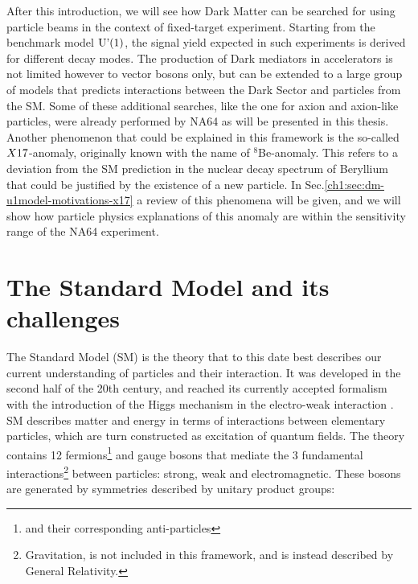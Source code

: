 After this introduction, we will see how Dark Matter can be searched for using particle beams in the context of fixed-target experiment. Starting from the benchmark model $\textrm{U'(1)}$, the signal yield expected in such experiments is derived for different decay modes. The production of Dark mediators in accelerators is not limited however to vector bosons only, but can be extended to a large group of models that predicts interactions between the Dark Sector and particles from the SM. Some of these additional searches, like the one for axion and axion-like particles, were already performed by NA64 as will be presented in this thesis.
Another phenomenon that could be explained in this framework is the so-called $X17$-anomaly, originally known with the name of $^8$Be-anomaly. This refers to a deviation from the SM prediction in the nuclear decay spectrum of Beryllium that could be justified by the existence of a new particle. In Sec.\ref{ch1:sec:dm-u1model-motivations-x17} a review of this phenomena will be given, and we will show how particle physics explanations of this anomaly are within the sensitivity range of the NA64 experiment.


\section{The Standard Model and its challenges}
\label{ch1:sec:sm-puzzles}

The Standard Model (SM) is the theory that to this date best describes our current understanding of particles and their interaction. It was developed in the second half of the 20th century, and reached its currently accepted formalism with the introduction of the Higgs mechanism \cite{PhysRevLett.13.508} in the electro-weak interaction \cite{PhysRevLett.19.1264}. SM describes matter and energy in terms of interactions between elementary particles, which are turn constructed as excitation of quantum fields. The theory contains 12 fermions\footnote{and their corresponding anti-particles} and gauge bosons that mediate the 3 fundamental interactions\footnote{Gravitation, is not included in this framework, and is instead described by General Relativity.} between particles: strong, weak and electromagnetic. These bosons are generated by symmetries described by unitary product groups:

